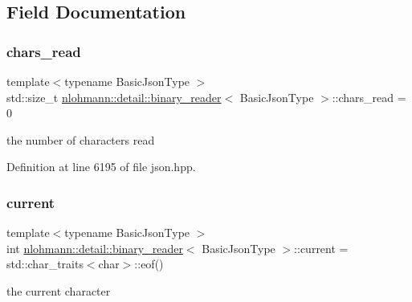 \subsection{Field Documentation}
\mbox{\label{classnlohmann_1_1detail_1_1binary__reader_a2dbde0b7390100efe0bfc54e21c3a34b}} 
\subsubsection{\texorpdfstring{chars\+\_\+read}{chars\_read}}
{\footnotesize\ttfamily template$<$typename Basic\+Json\+Type $>$ \\
std\+::size\+\_\+t \hyperlink{classnlohmann_1_1detail_1_1binary__reader}{nlohmann\+::detail\+::binary\+\_\+reader}$<$ Basic\+Json\+Type $>$\+::chars\+\_\+read = 0\hspace{0.3cm}{\ttfamily [private]}}



the number of characters read 



Definition at line 6195 of file json.\+hpp.

\mbox{\label{classnlohmann_1_1detail_1_1binary__reader_a7e994e201b215cd6d6ae28a1853f43e0}} 
\subsubsection{\texorpdfstring{current}{current}}
{\footnotesize\ttfamily template$<$typename Basic\+Json\+Type $>$ \\
int \hyperlink{classnlohmann_1_1detail_1_1binary__reader}{nlohmann\+::detail\+::binary\+\_\+reader}$<$ Basic\+Json\+Type $>$\+::current = std\+::char\+\_\+traits$<$char$>$\+::eof()\hspace{0.3cm}{\ttfamily [private]}}



the current character 



